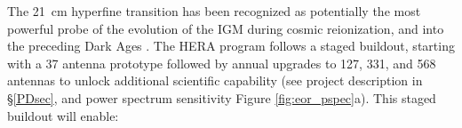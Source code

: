 \documentclass[preprint]{aastex}
\begin{document}
The 21~cm hyperfine transition has been recognized as potentially the most
powerful probe of the evolution of the IGM during cosmic reionization, and into
the preceding Dark Ages \citep{morales_wyithe2010,furlanetto_et_al2006}. 
The HERA program follows a staged buildout, starting with a 37 antenna prototype followed by annual upgrades to 127, 331, and 568 antennas to unlock additional scientific capability (see project description in \S \ref{PDsec}, and power spectrum sensitivity Figure \ref{fig:eor_pspec}a).  This staged buildout will enable:
\end{document}

